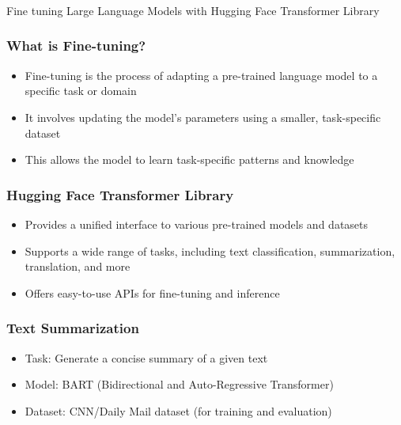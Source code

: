 \begin{frame}[fragile]\frametitle{}
\begin{center}
{\Large Fine tuning Large Language Models with Hugging Face Transformer Library}


\end{center}
\end{frame}

\begin{frame}[fragile]\frametitle{What is Fine-tuning?}
  \begin{itemize}
    \item Fine-tuning is the process of adapting a pre-trained language model to a specific task or domain
    \item It involves updating the model's parameters using a smaller, task-specific dataset
    \item This allows the model to learn task-specific patterns and knowledge
  \end{itemize}
\end{frame}

\begin{frame}[fragile]\frametitle{Hugging Face Transformer Library}
  \begin{itemize}
    \item Provides a unified interface to various pre-trained models and datasets
    \item Supports a wide range of tasks, including text classification, summarization, translation, and more
    \item Offers easy-to-use APIs for fine-tuning and inference
  \end{itemize}
\end{frame}

\begin{frame}[fragile]\frametitle{Text Summarization}
  \begin{itemize}
    \item Task: Generate a concise summary of a given text
    \item Model: BART (Bidirectional and Auto-Regressive Transformer)
    \item Dataset: CNN/Daily Mail dataset (for training and evaluation)
  \end{itemize}
\end{frame}

